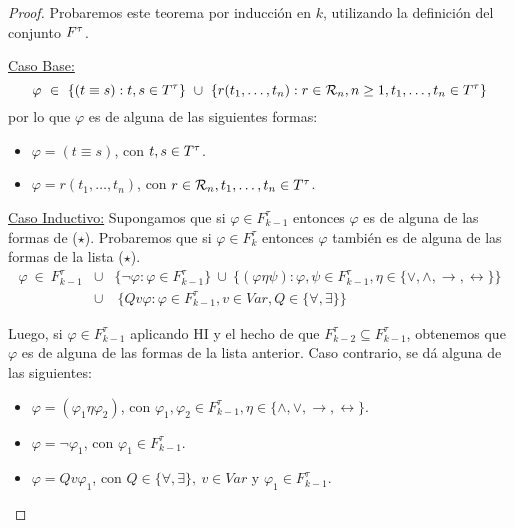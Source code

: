   \begin{proof}
    \PN Probaremos este teorema por inducción en $k$, utilizando la definición del conjunto $F^{\tau}$.

    \vspace{3mm}
    \PN \underline{Caso Base:}
    \[
      \varphi \ \in \ \{(t \equiv s): t, s \in T^{\tau}\} \ \cup \ \{r(t_{1}, \dotsc, t_{n}): r \in \mathcal{R}_{n}, n \geq
      1, t_{1}, \dotsc, t_{n} \in T^{\tau}\}
    \]
    \PN por lo que $\varphi$ es de alguna de las siguientes formas:
    \begin{itemize}
      \item $\varphi = (t \equiv s)$, con $t, s \in T^{\tau}$.
      \item $\varphi = r(t_{1}, \dotsc, t_{n})$, con $r \in \mathcal{R}_{n}, t_{1}, \dotsc, t_{n} \in T^{\tau}$.
    \end{itemize}

    \vspace{3mm}
		\PN \underline{Caso Inductivo:} Supongamos que si $\varphi \in F_{k-1}^{\tau}$ entonces $\varphi$ es de alguna de
    las formas de ($\star$). Probaremos que si $\varphi \in F_{k}^{\tau}$ entonces $\varphi$ también es de alguna de las
    formas de la lista ($\star$).
    \begin{eqnarray*}
      \varphi \ \in \ F_{k-1}^{\tau} &\cup& \{\lnot \varphi: \varphi \in F_{k-1}^{\tau}\} \ \cup \ \{(\varphi \eta \psi):
        \varphi, \psi \in F_{k-1}^{\tau}, \eta \in \{\vee, \wedge, \rightarrow, \leftrightarrow\}\} \\
      &\cup& \ \{Qv\varphi: \varphi \in F_{k-1}^{\tau}, v \in Var, Q \in \{\forall, \exists\}\}
    \end{eqnarray*}

    \PN Luego, si $\varphi \in F_{k-1}^{\tau}$ aplicando HI y el hecho de que $F_{k-2}^{\tau} \subseteq F_{k-1}^{\tau}$,
    obtenemos que $\varphi$ es de alguna de las formas de la lista anterior. Caso contrario, se dá alguna de las
    siguientes:
    \begin{itemize}
      \item $\varphi = (\varphi_{1} \eta \varphi_{2})$, con $\varphi_{1}, \varphi_{2} \in F_{k-1}^{\tau}, \eta \in
      \{\wedge, \vee, \rightarrow, \leftrightarrow\}$.
      \item $\varphi = \lnot \varphi_{1}$, con $\varphi_{1} \in F_{k-1}^{\tau}$.
      \item $\varphi = Qv\varphi_{1}$, con $Q \in \{\forall, \exists\}, \ v \in Var$ y $\varphi_{1} \in F_{k-1}^{\tau}$.
    \end{itemize}
  \end{proof}

